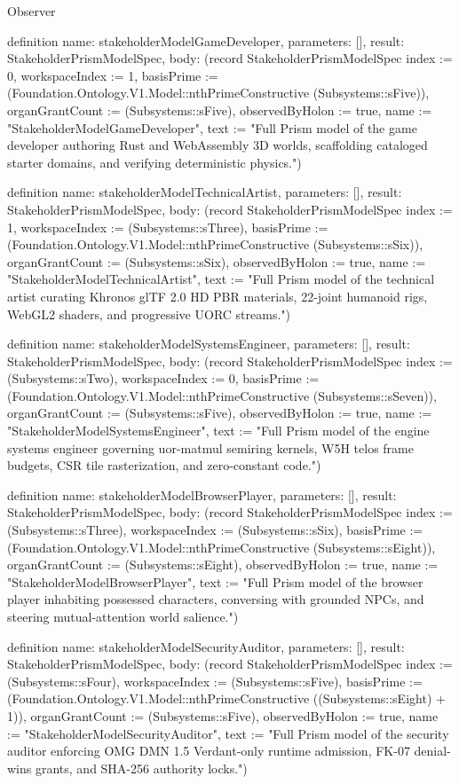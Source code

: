 \begin{lexlean}{Observer}
\begin{semanticmodule}
definition{
  name: stakeholderModelGameDeveloper,
  parameters: [],
  result: StakeholderPrismModelSpec,
  body: (record StakeholderPrismModelSpec {index := 0, workspaceIndex := 1, basisPrime := (Foundation.Ontology.V1.Model::nthPrimeConstructive (Subsystems::sFive)), organGrantCount := (Subsystems::sFive), observedByHolon := true, name := "StakeholderModelGameDeveloper", text := "Full Prism model of the game developer authoring Rust and WebAssembly 3D worlds, scaffolding cataloged starter domains, and verifying deterministic physics."})
}

definition{
  name: stakeholderModelTechnicalArtist,
  parameters: [],
  result: StakeholderPrismModelSpec,
  body: (record StakeholderPrismModelSpec {index := 1, workspaceIndex := (Subsystems::sThree), basisPrime := (Foundation.Ontology.V1.Model::nthPrimeConstructive (Subsystems::sSix)), organGrantCount := (Subsystems::sSix), observedByHolon := true, name := "StakeholderModelTechnicalArtist", text := "Full Prism model of the technical artist curating Khronos glTF 2.0 HD PBR materials, 22-joint humanoid rigs, WebGL2 shaders, and progressive UORC streams."})
}

definition{
  name: stakeholderModelSystemsEngineer,
  parameters: [],
  result: StakeholderPrismModelSpec,
  body: (record StakeholderPrismModelSpec {index := (Subsystems::sTwo), workspaceIndex := 0, basisPrime := (Foundation.Ontology.V1.Model::nthPrimeConstructive (Subsystems::sSeven)), organGrantCount := (Subsystems::sFive), observedByHolon := true, name := "StakeholderModelSystemsEngineer", text := "Full Prism model of the engine systems engineer governing uor-matmul semiring kernels, W5H telos frame budgets, CSR tile rasterization, and zero-constant code."})
}

definition{
  name: stakeholderModelBrowserPlayer,
  parameters: [],
  result: StakeholderPrismModelSpec,
  body: (record StakeholderPrismModelSpec {index := (Subsystems::sThree), workspaceIndex := (Subsystems::sSix), basisPrime := (Foundation.Ontology.V1.Model::nthPrimeConstructive (Subsystems::sEight)), organGrantCount := (Subsystems::sEight), observedByHolon := true, name := "StakeholderModelBrowserPlayer", text := "Full Prism model of the browser player inhabiting possessed characters, conversing with grounded NPCs, and steering mutual-attention world salience."})
}

definition{
  name: stakeholderModelSecurityAuditor,
  parameters: [],
  result: StakeholderPrismModelSpec,
  body: (record StakeholderPrismModelSpec {index := (Subsystems::sFour), workspaceIndex := (Subsystems::sFive), basisPrime := (Foundation.Ontology.V1.Model::nthPrimeConstructive ((Subsystems::sEight) + 1)), organGrantCount := (Subsystems::sFive), observedByHolon := true, name := "StakeholderModelSecurityAuditor", text := "Full Prism model of the security auditor enforcing OMG DMN 1.5 Verdant-only runtime admission, FK-07 denial-wins grants, and SHA-256 authority locks."})
}


\end{semanticmodule}
\end{lexlean}
